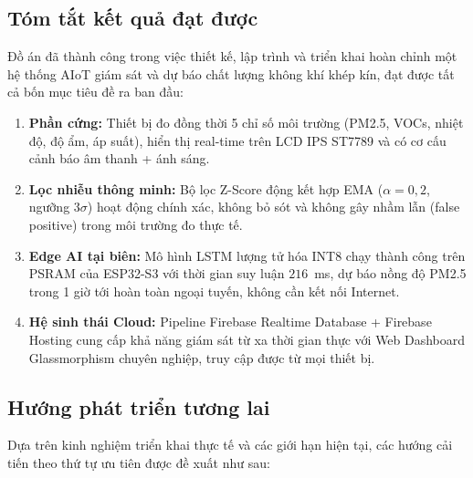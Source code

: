\documentclass[12pt,a4paper]{article}
\begin{document}
\subsection{Tóm tắt kết quả đạt được}

Đồ án đã thành công trong việc thiết kế, lập trình và triển khai hoàn chỉnh một hệ thống AIoT giám sát và dự báo chất lượng không khí khép kín, đạt được tất cả bốn mục tiêu đề ra ban đầu:

\begin{enumerate}
    \item \textbf{Phần cứng:} Thiết bị đo đồng thời 5 chỉ số môi trường (PM2.5, VOCs, nhiệt độ, độ ẩm, áp suất), hiển thị real-time trên LCD IPS ST7789 và có cơ cấu cảnh báo âm thanh + ánh sáng.

    \item \textbf{Lọc nhiễu thông minh:} Bộ lọc Z-Score động kết hợp EMA ($\alpha=0{,}2$, ngưỡng $3\sigma$) hoạt động chính xác, không bỏ sót và không gây nhầm lẫn (false positive) trong môi trường đo thực tế.

    \item \textbf{Edge AI tại biên:} Mô hình LSTM lượng tử hóa INT8 chạy thành công trên PSRAM của ESP32-S3 với thời gian suy luận $216$~ms, dự báo nồng độ PM2.5 trong 1 giờ tới hoàn toàn ngoại tuyến, không cần kết nối Internet.

    \item \textbf{Hệ sinh thái Cloud:} Pipeline Firebase Realtime Database + Firebase Hosting cung cấp khả năng giám sát từ xa thời gian thực với Web Dashboard Glassmorphism chuyên nghiệp, truy cập được từ mọi thiết bị.
\end{enumerate}

\subsection{Hướng phát triển tương lai}

Dựa trên kinh nghiệm triển khai thực tế và các giới hạn hiện tại, các hướng cải tiến theo thứ tự ưu tiên được đề xuất như sau:
\end{document}
